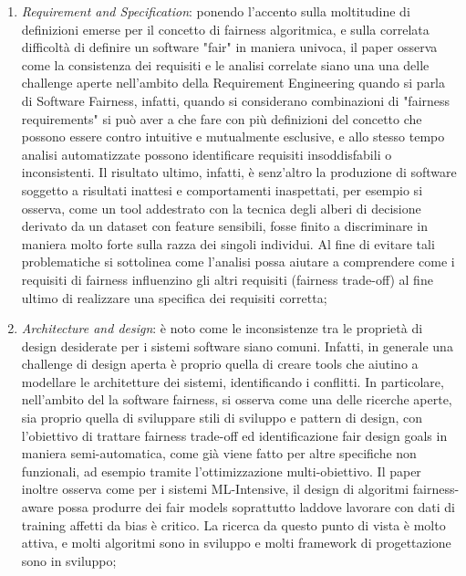 \begin{enumerate}
    \item \emph{Requirement and Specification}: ponendo l'accento sulla moltitudine di definizioni emerse per il concetto di fairness algoritmica, e sulla correlata difficoltà di definire un software "fair" in maniera univoca, il paper osserva come la consistenza dei requisiti e le analisi correlate siano una una delle challenge aperte nell'ambito della Requirement Engineering quando si parla di Software Fairness, infatti, quando si considerano combinazioni di "fairness requirements" si può aver a che fare con più definizioni del concetto che possono essere contro intuitive e mutualmente esclusive, e allo stesso tempo analisi automatizzate possono identificare requisiti insoddisfabili o inconsistenti. Il risultato ultimo, infatti, è senz'altro la produzione di software soggetto a risultati inattesi e comportamenti inaspettati, per esempio si osserva, come un tool addestrato con la tecnica degli alberi di decisione derivato da un dataset con feature sensibili, fosse finito a discriminare in maniera molto forte sulla razza dei singoli individui. Al fine di evitare tali problematiche si sottolinea come l'analisi possa aiutare a comprendere come i requisiti di fairness influenzino gli altri requisiti (fairness trade-off) al fine ultimo di realizzare una specifica dei requisiti corretta;
    \item \emph{Architecture and design}: è noto come le inconsistenze tra le proprietà di design desiderate per i sistemi software siano comuni. Infatti, in generale una challenge di design aperta è proprio quella di creare tools che aiutino a modellare le architetture dei sistemi, identificando i conflitti. In particolare, nell'ambito del la software fairness, si osserva come una delle ricerche aperte, sia proprio quella di sviluppare stili di sviluppo e pattern di design, con l'obiettivo di trattare fairness trade-off ed identificazione fair design goals  in maniera semi-automatica, come già viene fatto per altre specifiche non funzionali, ad esempio tramite l'ottimizzazione multi-obiettivo. Il paper inoltre osserva come  per i sistemi ML-Intensive, il design di algoritmi fairness-aware possa produrre dei fair models soprattutto laddove lavorare con dati di training affetti da bias è critico. La ricerca da questo punto di vista è molto attiva, e molti algoritmi sono in sviluppo e molti framework di progettazione sono in sviluppo;
    

\end{enumerate}
